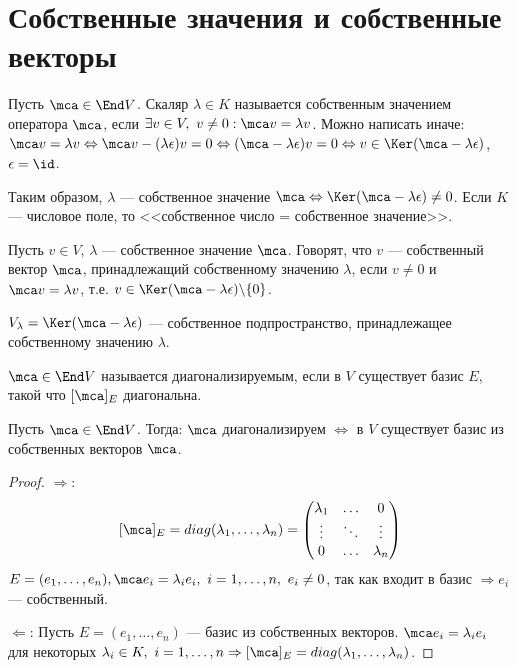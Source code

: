 \documentclass[main]{subfiles}
\begin{document}
\chapter{Собственные значения и собственные векторы}

Пусть $\mca \in \End V$. Скаляр $\lambda \in K$ называется собственным значением оператора
$\mca$, если $\exists v \in V,\ v \neq 0 : \mca v = \lambda v$.
Можно написать иначе: $\mca v = \lambda v \Leftrightarrow \mca v - (\lambda \epsilon) v = 0
\Leftrightarrow (\mca -\lambda\epsilon)v = 0 
\Leftrightarrow v \in \Ker(\mca -\lambda\epsilon)$, $\epsilon = \id$.

\begin{definition}
    Таким образом, $\lambda$  —  собственное значение $\mca 
    \Leftrightarrow  \Ker(\mca -\lambda\epsilon) \neq 0$. 
    Если $K$ — числовое поле, то <<собственное число = собственное значение>>.
\end{definition}

\begin{definition}
    Пусть $v \in V$, $\lambda$ — собственное значение $\mca$. 
    Говорят, что $v$ — собственный вектор $\mca$, принадлежащий собственному значению
    $\lambda$, если $v \neq 0$ и $\mca v = \lambda v$,
    т.е. $v \in \Ker (\mca - \lambda \epsilon) \backslash  \{0\}$.
\end{definition}

\begin{definition}
    $V_\lambda = \Ker(\mca - \lambda \epsilon)$ —  
    собственное подпространство, принадлежащее собственному значению $\lambda$.    
\end{definition}

\begin{definition}
    $\mca  \in \End V$ называется диагонализируемым, если в $V$ существует 
    базис $E$, такой что $[\mca]_E$ диагональна.
\end{definition}
 
\begin{proposition}
    Пусть $\mca \in \End V$. Тогда: $\mca$ диагонализируем 
    $\Leftrightarrow$ в $V$ существует базис из собственных векторов $\mca$.
\end{proposition}
 
\begin{proof}
    $\Rightarrow:$
    \[ [\mca]_E = diag(\lambda_1, \ldots, \lambda_n) = \begin{pmatrix}
            \lambda_1 & \ldots & 0         \\
            \vdots    & \ddots & \vdots    \\
            0         & \ldots & \lambda_n \\
        \end{pmatrix}\]
    $ E = (e_1, \ldots, e_n), \mca e_i = \lambda_i e_i,\ i = 1, \ldots, n,\ e_i \neq 0 $,
    так как входит в базис $\Rightarrow e_i$ — собственный.

    $\Leftarrow$: Пусть  $E = (e_1, \ldots, e_n)$ — базис из собственных векторов.
     $\mca e_i = \lambda_i e_i$ для некоторых $\lambda_i \in K, \ i = 1, \ldots, n 
    \Rightarrow [\mca]_E
     = diag(\lambda_1, \ldots, \lambda_n)$.
\end{proof}
\end{document}

